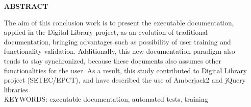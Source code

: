 \begin{center}
\textbf{ABSTRACT}
\end{center}
\singlespacing

\noindent The aim of this conclusion work is to present the executable documentation, applied in the Digital Library project, as an evolution of traditional documentation, bringing advantages such as possibility of user training and functionality validation. Additionally, this new documentation paradigm also tends to stay synchronized, because these documents also assumes other functionalities for the user. As a result, this study contributed to Digital Library project (SETEC/EPCT), and have described the use of Amberjack2 and jQuery libraries. \\

\noindent KEYWORDS: executable documentation, automated tests, training
